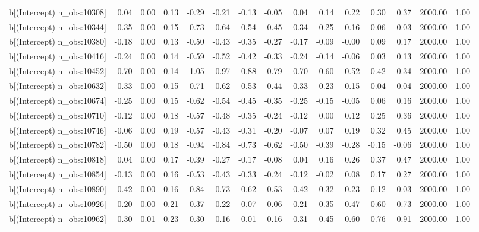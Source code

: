 \begin{table}[ht]
\begin{tabular}{rrrrrrrrrrrrrrr}
  b[(Intercept) n\_obs:10308] & 0.04 & 0.00 & 0.13 & -0.29 & -0.21 & -0.13 & -0.05 & 0.04 & 0.14 & 0.22 & 0.30 & 0.37 & 2000.00 & 1.00 \\ 
  b[(Intercept) n\_obs:10344] & -0.35 & 0.00 & 0.15 & -0.73 & -0.64 & -0.54 & -0.45 & -0.34 & -0.25 & -0.16 & -0.06 & 0.03 & 2000.00 & 1.00 \\ 
  b[(Intercept) n\_obs:10380] & -0.18 & 0.00 & 0.13 & -0.50 & -0.43 & -0.35 & -0.27 & -0.17 & -0.09 & -0.00 & 0.09 & 0.17 & 2000.00 & 1.00 \\ 
  b[(Intercept) n\_obs:10416] & -0.24 & 0.00 & 0.14 & -0.59 & -0.52 & -0.42 & -0.33 & -0.24 & -0.14 & -0.06 & 0.03 & 0.13 & 2000.00 & 1.00 \\ 
  b[(Intercept) n\_obs:10452] & -0.70 & 0.00 & 0.14 & -1.05 & -0.97 & -0.88 & -0.79 & -0.70 & -0.60 & -0.52 & -0.42 & -0.34 & 2000.00 & 1.00 \\ 
  b[(Intercept) n\_obs:10632] & -0.33 & 0.00 & 0.15 & -0.71 & -0.62 & -0.53 & -0.44 & -0.33 & -0.23 & -0.15 & -0.04 & 0.04 & 2000.00 & 1.00 \\ 
  b[(Intercept) n\_obs:10674] & -0.25 & 0.00 & 0.15 & -0.62 & -0.54 & -0.45 & -0.35 & -0.25 & -0.15 & -0.05 & 0.06 & 0.16 & 2000.00 & 1.00 \\ 
  b[(Intercept) n\_obs:10710] & -0.12 & 0.00 & 0.18 & -0.57 & -0.48 & -0.35 & -0.24 & -0.12 & 0.00 & 0.12 & 0.25 & 0.36 & 2000.00 & 1.00 \\ 
  b[(Intercept) n\_obs:10746] & -0.06 & 0.00 & 0.19 & -0.57 & -0.43 & -0.31 & -0.20 & -0.07 & 0.07 & 0.19 & 0.32 & 0.45 & 2000.00 & 1.00 \\ 
  b[(Intercept) n\_obs:10782] & -0.50 & 0.00 & 0.18 & -0.94 & -0.84 & -0.73 & -0.62 & -0.50 & -0.39 & -0.28 & -0.15 & -0.06 & 2000.00 & 1.00 \\ 
  b[(Intercept) n\_obs:10818] & 0.04 & 0.00 & 0.17 & -0.39 & -0.27 & -0.17 & -0.08 & 0.04 & 0.16 & 0.26 & 0.37 & 0.47 & 2000.00 & 1.00 \\ 
  b[(Intercept) n\_obs:10854] & -0.13 & 0.00 & 0.16 & -0.53 & -0.43 & -0.33 & -0.24 & -0.12 & -0.02 & 0.08 & 0.17 & 0.27 & 2000.00 & 1.00 \\ 
  b[(Intercept) n\_obs:10890] & -0.42 & 0.00 & 0.16 & -0.84 & -0.73 & -0.62 & -0.53 & -0.42 & -0.32 & -0.23 & -0.12 & -0.03 & 2000.00 & 1.00 \\ 
  b[(Intercept) n\_obs:10926] & 0.20 & 0.00 & 0.21 & -0.37 & -0.22 & -0.07 & 0.06 & 0.21 & 0.35 & 0.47 & 0.60 & 0.73 & 2000.00 & 1.00 \\ 
  b[(Intercept) n\_obs:10962] & 0.30 & 0.01 & 0.23 & -0.30 & -0.16 & 0.01 & 0.16 & 0.31 & 0.45 & 0.60 & 0.76 & 0.91 & 2000.00 & 1.00 \\ 

\end{tabular}
\end{table}
